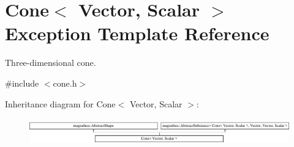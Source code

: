 \hypertarget{exceptionCone}{\section{Cone$<$ Vector, Scalar $>$ Exception Template Reference}
\label{exceptionCone}
}


Three-\/dimensional cone.  




{\ttfamily \#include $<$cone.\-h$>$}

Inheritance diagram for Cone$<$ Vector, Scalar $>$\-:\begin{figure}[H]
\begin{center}
\leavevmode
\includegraphics[height=1.135903cm]{exceptionCone}
\end{center}
\end{figure}
